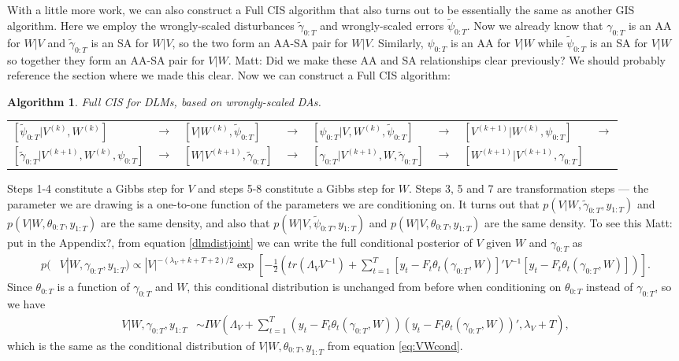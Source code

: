 \documentclass{article}
\newtheorem{alg}{Algorithm}
\newcommand{\matt}[1]{{\color{red} Matt: #1}}
\begin{document}
With a little more work, we can also construct a Full CIS algorithm that also turns out to be essentially the same as another GIS algorithm. Here we employ the wrongly-scaled disturbances $\tilde{\gamma}_{0:T}$ and wrongly-scaled errors $\tilde{\psi}_{0:T}$. Now we already know that $\gamma_{0:T}$ is an AA for $W|V$ and $\tilde{\gamma}_{0:T}$ is an SA for $W|V$, so the two form an AA-SA pair for $W|V$. Similarly,  $\psi_{0:T}$ is an AA for $V|W$ while $\tilde{\psi}_{0:T}$ is an SA for $V|W$ so together they form an AA-SA pair for $V|W$. \matt{Did we make these AA and SA relationships clear previously? We should probably reference the section where we made this clear.} Now we can construct a Full CIS algorithm:
\begin{alg}Full CIS for DLMs, based on wrongly-scaled DAs.\label{alg:FCIS}\\
  \begin{center}
    \begin{tabular}{llllllll}
      $[\tilde{\psi}_{0:T}|V^{(k)},W^{(k)}]$& $\to$& $[V|W^{(k)},\tilde{\psi}_{0:T}]$& $\to$& $[\psi_{0:T}|V,W^{(k)},\tilde{\psi}_{0:T}]$& $\to$& $[V^{(k+1)}|W^{(k)},\psi_{0:T}]$& $\to$\\
      $[\tilde{\gamma}_{0:T}|V^{(k+1)},W^{(k)},\psi_{0:T}]$&$\to$& $[W|V^{(k+1)},\tilde{\gamma}_{0:T}]$& $\to$& $[\gamma_{0:T}|V^{(k+1)},W,\tilde{\gamma}_{0:T}]$& $\to$& $[W^{(k+1)}|V^{(k+1)},\gamma_{0:T}]$
    \end{tabular}
  \end{center}
\noindent \end{alg}
Steps 1-4 constitute a Gibbs step for $V$ and steps 5-8 constitute a Gibbs step for $W$. Steps 3, 5 and 7 are transformation steps --- the parameter we are drawing is a one-to-one function of the parameters we are conditioning on. It turns out that $p(V|W,\tilde{\gamma}_{0:T},y_{1:T})$ and $p(V|W,\theta_{0:T},y_{1:T})$ are the same density, and also that $p(W|V,\tilde{\psi}_{0:T},y_{1:T})$ and $p(W|V,\theta_{0:T},y_{1:T})$ are the same density. To see this \matt{put in the Appendix?}, from equation \eqref{dlmdistjoint} we can write the full conditional posterior of $V$ given $W$ and $\gamma_{0:T}$ as
 \begin{align*}
  p(&V|W,\gamma_{0:T},y_{1:T}) \propto |V|^{-(\lambda_V + k + T + 2)/2} \exp\left[-\frac{1}{2}\left(tr\left(\Lambda_VV^{-1}\right) + \sum_{t=1}^T\left[y_t-F_t\theta_t(\gamma_{0:T},W)\right]'V^{-1}\left[y_t-F_t\theta_t(\gamma_{0:T},W)\right]\right)\right].
 \end{align*}
Since $\theta_{0:T}$ is a function of $\gamma_{0:T}$ and $W$, this conditional distribution is unchanged from before when conditioning on $\theta_{0:T}$ instead of $\gamma_{0:T}$, so we have 
\begin{align*}
  V|W,\gamma_{0:T},y_{1:T} &\sim IW\left(\Lambda_V + \sum_{t=1}^T(y_t-F_t\theta_t(\gamma_{0:T},W))(y_t-F_t\theta_t(\gamma_{0:T},W))',\lambda_V + T\right),
\end{align*}
which is the same as the conditional distribution of $V|W,\theta_{0:T},y_{1:T}$ from equation \eqref{eq:VWcond}.
\end{document}
